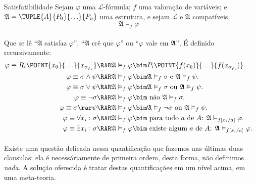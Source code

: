         \begin{definition}{Satisfatibilidade}
                Sejam $\varphi$ uma $\mathcal{L}$-fórmula;
                $f$ uma valoração de variáveis; e %
                $\mathfrak{A} = \TUPLE{A}{P_0}{\ldots}{P_n}$
                uma estrutura, e sejam $\mathcal{L}$ e
                $\mathfrak{A}$ compatíveis.
                $$ \mathfrak A\vDash_f\varphi$$
            \paragraph{}
                Que se lê  ``$\mathfrak{A}$ satisfaz
                $\varphi$'', ``$\mathfrak{A}$ crê que
                $\varphi$'' ou ``$\varphi$ vale em
                $\mathfrak{A}$'', É definido recursivamente:
            \begin{align*}
                \varphi\equiv R_i\POINT{x_0}{\ldots}{x_{\alpha_{\rho_i}}}
                    &\RAR \mathfrak A\vDash_f\varphi \bim P_i\POINT{f(x_0)}{\ldots}{f(x_{\alpha_{\rho_i}})}.\\
                \varphi\equiv \sigma\land\psi
                    &\RAR \mathfrak A\vDash_f\varphi \bim \mathfrak A\vDash_f\sigma \text{ e } \mathfrak A\vDash_f\psi.\\
                \varphi\equiv \sigma\lor \psi
                    &\RAR \mathfrak A\vDash_f\varphi \bim \mathfrak A\vDash_f\sigma \text{ ou } \mathfrak A\vDash_f\psi.\\
                \varphi\equiv \neg\sigma
                    &\RAR \mathfrak A\vDash_f\varphi \bim \text{ não }\mathfrak A\vDash_f\sigma.\\
                \varphi\equiv \sigma\rar\psi
                    &\RAR \mathfrak A\vDash_f\varphi \bim \mathfrak A\vDash_f\neg\sigma \text{ ou } \mathfrak A\vDash_f\psi.\\
                \varphi\equiv \forall x_i:\sigma
                    &\RAR \mathfrak A\vDash_f\varphi \bim \text{ para todo $a$ de $A$: } \mathfrak A\vDash_{f[x_i\slash{a}]}\varphi.\\
                \varphi\equiv \exists x_i:\sigma
                    &\RAR \mathfrak A\vDash_f\varphi \bim \text{ existe algum $a$ de $A$: } \mathfrak A\vDash_{f[x_i\slash{a}]}\varphi.
            \end{align*} %
            \paragraph{}
                Existe uma questão delicada nessa quantificação
                que fazemos nas últimas duas clausulas: ela é
                necessáriamente de primeira ordem, desta forma, %
                não definimos {\em nada}. A solução oferecida é %
                tratar destas quantificações em um nível acima,
                em uma meta-teoria. %
        \end{definition}

